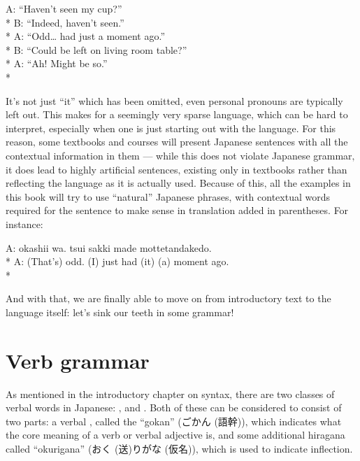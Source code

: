 \documentclass[11pt, b5paper, twoside, openright, onecolumn]{book}
\makeatletter
\newcommand*{\rubystack}[2]{{\relscale{0.5}%
  \begin{tabular}[b]{@{}c@{}}%
    {#1}\\%
   {\textscale{2}{#2}}%
  \end{tabular}}%
}
\DeclareRobustCommand*{\ruby}[2]{%
  \mbox{%
    \setlength{\parskip}{0ex}%
    \BeginAccSupp{method=pdfstringdef,ActualText={#1}}%
      \rubystack{\phantom{#2}}{#1}%
      \llap{%
        \rubystack{#2}{\phantom{#1}}%
      }%
    \EndAccSupp{}%
  }%
}
\renewcommand*{\ruby}[2]{#2 (#1)}%
\newenvironment{exampleblock}{
\setlength{\parindent}{0.6in}
\begin{minipage}[t]{\dimexpr\textwidth-\parindent}}
{\end{minipage}}
\makeatother
\begin{document}
\vspace{0.4cm}
\begin{exampleblock}
A: “Haven’t seen my cup?” \\* 
B: “Indeed‚ haven’t seen.” \\* 
A: “Odd… had just a moment ago.” \\* 
B: “Could be left on living room table?” \\* 
A: “Ah! Might be so.” \\* 
\end{exampleblock}
\vspace{0.2cm}

It’s not just “it” which has been omitted‚ even personal pronouns are typically left out. This makes for a seemingly very sparse language‚ which can be hard to interpret‚ especially when one is just starting out with the language. For this reason‚ some textbooks and courses will present Japanese sentences with all the contextual information in them — while this does not violate Japanese grammar‚ it does lead to highly artificial sentences‚ existing only in textbooks rather than reflecting the language as it is actually used. Because of this‚ all the examples in this book will try to use “natural” Japanese phrases‚ with contextual words required for the sentence to make sense in translation added in parentheses. For instance:

\vspace{0.4cm}
\begin{exampleblock}
A: okashii wa. tsui sakki made mottetandakedo. \\* 
A: (That’s) odd. (I) just had (it) (a) moment ago. \\* 
\end{exampleblock}
\vspace{0.2cm}

And with that‚ we are finally able to move on from introductory text to the language itself: let’s sink our teeth in some grammar!


\chapter{Verb grammar}

As mentioned in the introductory chapter on syntax‚ there are two classes of verbal words in Japanese: ‚ and . Both of these can be considered to consist of two parts: a verbal ‚ called the “gokan” (\ruby{語幹}{ごかん})‚ which indicates what the core meaning of a verb or verbal adjective is‚ and some additional hiragana called “okurigana” (\ruby{送}{おく}り\ruby{仮名}{がな})‚ which is used to indicate inflection.
\end{document}
